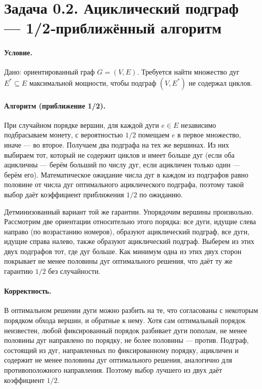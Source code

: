 \documentclass[12pt]{article}
\begin{document}
  \section*{Задача 0.2. Ациклический подграф — 1/2‑приближённый алгоритм}

  \paragraph{Условие.}
  Дано: ориентированный граф $G=(V,E)$. Требуется найти множество дуг $E^*\subseteq E$ максимальной мощности, чтобы подграф $(V,E^*)$ не содержал циклов.

  \paragraph{Алгоритм (приближение 1/2).}
  При случайном порядке вершин, для каждой дуги $e\in E$ независимо подбрасываем монету, с вероятностью $1/2$ помещаем $e$ в первое множество, иначе — во второе. Получаем два подграфа на тех же вершинах. Из них выбираем тот, который не содержит циклов и имеет больше дуг (если оба ацикличны — берём больший по числу дуг, если ацикличен только один — берём его). Математическое ожидание числа дуг в каждом из подграфов равно половине от числа дуг оптимального ациклического подграфа, поэтому такой выбор даёт коэффициент приближения $1/2$ по ожиданию.

  Детминизованный вариант той же гарантии. Упорядочим вершины произвольно. Рассмотрим две ориентации относительно этого порядка: все дуги, идущие слева направо (по возрастанию номеров), образуют ациклический подграф, все дуги, идущие справа налево, также образуют ациклический подграф. Выберем из этих двух подграфов тот, где дуг больше. Как минимум одна из этих двух сторон покрывает не менее половины дуг оптимального решения, что даёт ту же гарантию $1/2$ без случайности.

  \paragraph{Корректность.}
  В оптимальном решении дуги можно разбить на те, что согласованы с некоторым порядком обхода вершин, и обратные к нему. Хотя сам оптимальный порядок неизвестен, любой фиксированный порядок разбивает дуги пополам, не менее половины дуг направлено по порядку, не более половины — против. Подграф, состоящий из дуг, направленных по фиксированному порядку, ацикличен и содержит не менее половины дуг оптимального решения, аналогично для противоположного направления. Поэтому выбор лучшего из двух даёт коэффициент $1/2$.
  
\end{document}
